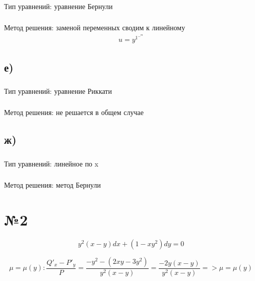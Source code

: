 \documentclass{article}
\begin{document}
\subsubsection*{} 
Тип уравнений: уравнение Бернули

\subsubsection*{}
Метод решения: заменой переменных сводим к линейному
\begin{gather*}
    u=y^1^-^m
\end{gather*}

\subsection*{е)}
\subsubsection*{} 
Тип уравнений: уравнение Риккати

\subsubsection*{}
Метод решения:  не решается в общем случае


\subsection*{ж)}
\subsubsection*{} 
Тип уравнений: линейное по x

\subsubsection*{}
Метод решения: метод Бернули 
\begin{equation*}
\end{equation*}

\section*{№2}

\begin{equation*}
y^2(x - y)dx + (1 - xy^2)dy = 0
\end{equation*}

\begin{equation*}
\mu = \mu(y): \frac{Q'_x - P'_y}{P} = \frac{-y^2 - (2xy - 3y^2)}{y^2(x - y)}=\frac{-2y(x-y)}{y^{2}(x-y)} => \mu = \mu(y)
\end{equation*}
\end{document}
